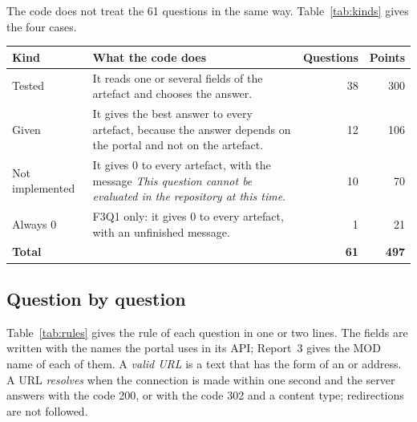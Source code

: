 \documentclass[11pt,a4paper]{article}
\begin{document}
The code does not treat the 61 questions in the same way. Table~\ref{tab:kinds} gives the four cases.

\begin{center}
\small
\renewcommand{\arraystretch}{1.2}
\begin{tabular}{@{}l>{\raggedright\arraybackslash}p{9.2cm}rr@{}}
\toprule
\textbf{Kind} & \textbf{What the code does} & \textbf{Questions} & \textbf{Points} \\
\midrule
Tested & It reads one or several fields of the artefact and chooses the answer. & 38 & 300 \\
Given & It gives the best answer to every artefact, because the answer depends on the portal
  and not on the artefact. & 12 & 106 \\
Not implemented & It gives 0 to every artefact, with the message \textit{This question cannot be
  evaluated in the repository at this time}. & 10 & 70 \\
Always 0 & F3Q1 only: it gives 0 to every artefact, with an unfinished message. & 1 & 21 \\
\midrule
\textbf{Total} & & \textbf{61} & \textbf{497} \\
\bottomrule
\end{tabular}
\label{tab:kinds}
\end{center}

\subsection{Question by question}

Table~\ref{tab:rules} gives the rule of each question in one or two lines. The fields are written
with the names the portal uses in its API; Report~3 gives the MOD name of each of them. A
\emph{valid URL} is a text that has the form of an  or  address. A URL
\emph{resolves} when the connection is made within one second and the server answers with the
code 200, or with the code 302 and a content type; redirections are not followed.
\end{document}
